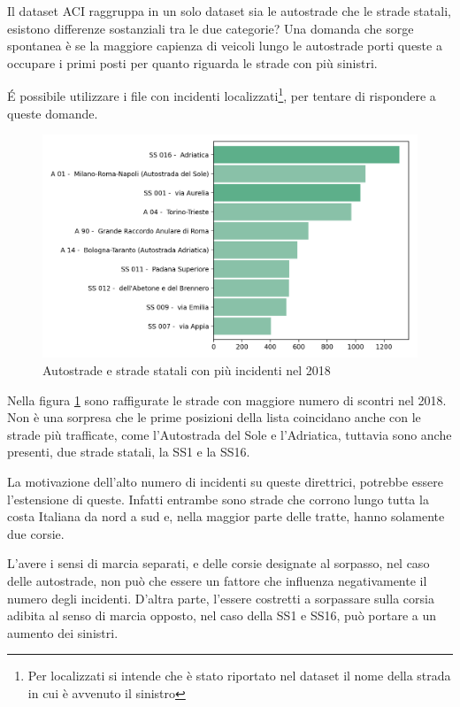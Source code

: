 \documentclass[a4paper,12pt]{report}
\begin{document}
Il dataset ACI raggruppa in un solo dataset sia le autostrade che le strade statali, 
esistono differenze sostanziali tra le due categorie? 
Una domanda che sorge spontanea è se
la maggiore capienza di veicoli lungo le autostrade porti queste a occupare i primi 
posti per quanto riguarda le strade con più sinistri. 

\'E possibile utilizzare i file con incidenti 
localizzati\footnote{Per localizzati si intende che è stato riportato nel dataset 
il nome della strada in cui è avvenuto il sinistro}, 
per tentare di rispondere a queste domande.

\begin{figure}
    \includegraphics[width=\linewidth]{../src/incidenti/incidenti_aci/autostrade/autostrade.png}
    \caption{Autostrade e strade statali con più incidenti nel 2018}
    \label{fig:incidenti-autostrade}
\end{figure}

Nella figura \ref{fig:incidenti-autostrade} sono  raffigurate le strade con 
maggiore numero di scontri nel 2018. 
Non è una sorpresa che le prime posizioni della lista coincidano 
anche con le strade più trafficate, come l'Autostrada del Sole e l'Adriatica, 
tuttavia sono anche presenti, due strade statali, la SS1 e la SS16. 

La motivazione dell'alto numero di incidenti su queste direttrici, potrebbe essere 
l'estensione di queste. Infatti entrambe sono strade che corrono lungo tutta la 
costa Italiana da nord a sud e, nella maggior parte delle tratte, 
hanno solamente due corsie.

L'avere i sensi di marcia separati, e delle corsie designate al sorpasso, nel caso 
delle autostrade, non può che essere un fattore che influenza negativamente 
il numero degli incidenti. 
D'altra parte, l'essere costretti a sorpassare sulla corsia adibita al senso di 
marcia opposto, nel caso della SS1 e SS16, può portare a un aumento dei 
sinistri.
\end{document}
